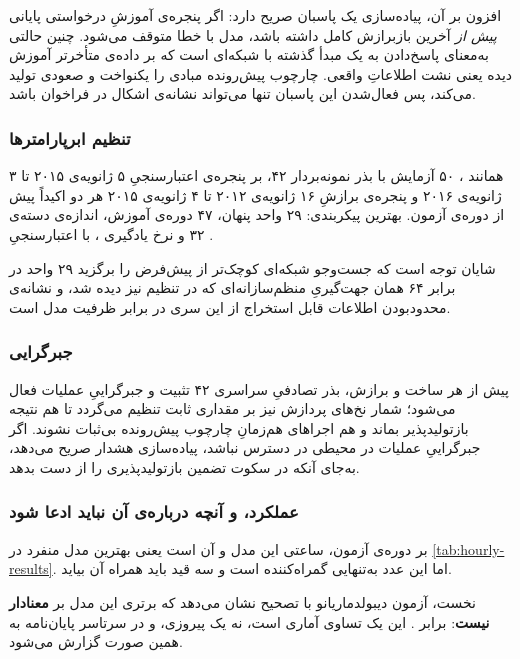 افزون بر آن، پیاده‌سازی یک پاسبان صریح دارد: اگر پنجره‌ی آموزشِ درخواستی پایانی
\emph{پیش از} آخرین بازبرازش کامل داشته باشد، مدل با خطا متوقف می‌شود. چنین حالتی
به‌معنای پاسخ‌دادن به یک مبدأ گذشته با شبکه‌ای است که بر داده‌ی متأخرتر آموزش دیده
 یعنی نشت اطلاعاتِ واقعی. چارچوب پیش‌رونده مبادی را یکنواخت و صعودی تولید
می‌کند، پس فعال‌شدن این پاسبان تنها می‌تواند نشانه‌ی اشکال در فراخوان باشد.

\subsubsection*{تنظیم ابرپارامترها}

همانند ، ۵۰ آزمایش  با بذر نمونه‌بردار ۴۲، بر پنجره‌ی
اعتبارسنجیِ ۵ ژانویه‌ی ۲۰۱۵ تا ۳ ژانویه‌ی ۲۰۱۶ و پنجره‌ی برازشِ ۱۶ ژانویه‌ی ۲۰۱۲ تا ۴
ژانویه‌ی ۲۰۱۵  هر دو اکیداً پیش از دوره‌ی آزمون. بهترین پیکربندی: ۲۹ واحد پنهان،
۴۷ دوره‌ی آموزش، اندازه‌ی دسته‌ی ۳۲ و نرخ یادگیری ، با  اعتبارسنجیِ
.

شایان توجه است که جست‌وجو شبکه‌ای کوچک‌تر از پیش‌فرض را برگزید  ۲۹ واحد در
برابر ۶۴  همان جهت‌گیریِ منظم‌سازانه‌ای که در تنظیم  نیز دیده شد،
و نشانه‌ی محدودبودن اطلاعات قابل استخراج از این سری در برابر ظرفیت مدل است.

\subsubsection*{جبرگرایی}

پیش از هر ساخت و برازش، بذر تصادفیِ سراسری ۴۲ تثبیت و جبرگراییِ عملیات فعال می‌شود؛
شمار نخ‌های پردازش نیز بر مقداری ثابت تنظیم می‌گردد تا هم نتیجه بازتولیدپذیر بماند و
هم اجراهای هم‌زمانِ چارچوب پیش‌رونده بی‌ثبات نشوند. اگر جبرگراییِ عملیات در محیطی
در دسترس نباشد، پیاده‌سازی هشدار صریح می‌دهد، به‌جای آنکه در سکوت تضمین
بازتولیدپذیری را از دست بدهد.

\subsubsection*{عملکرد، و آنچه درباره‌ی آن نباید ادعا شود}

بر دوره‌ی آزمون،  ساعتی این مدل  و  آن  است
 یعنی بهترین مدل منفرد در \cref{tab:hourly-results}. اما این عدد به‌تنهایی گمراه‌کننده است
و سه قید باید همراه آن بیاید.

نخست، آزمون دیبولدماریانو با تصحیح  نشان می‌دهد که برتری این مدل بر
 \textbf{معنادار نیست}:  برابر . این یک تساوی آماری
است، نه یک پیروزی، و در سرتاسر پایان‌نامه به همین صورت گزارش می‌شود.

